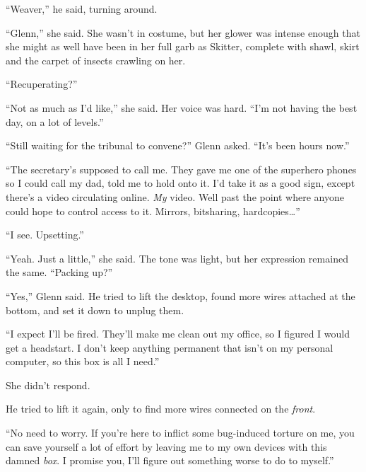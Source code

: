 ``Weaver,'' he said, turning around.



``Glenn,'' she said.  She wasn't in costume, but her glower was intense enough that she might as well have been in her full garb as Skitter, complete with shawl, skirt and the carpet of insects crawling on her.



``Recuperating?''



``Not as much as I'd like,'' she said.  Her voice was hard.  ``I'm not having the best day, on a lot of levels.''



``Still waiting for the tribunal to convene?''  Glenn asked.  ``It's been hours now.''



``The secretary's supposed to call me.  They gave me one of the superhero phones so I could call my dad, told me to hold onto it.  I'd take it as a good sign, except there's a video circulating online.  \emph{My} video.  Well past the point where anyone could hope to control access to it.  Mirrors, bitsharing, hardcopies\ldots''



``I see.  Upsetting.''



``Yeah.  Just a little,'' she said.  The tone was light, but her expression remained the same.  ``Packing up?''



``Yes,'' Glenn said.  He tried to lift the desktop, found more wires attached at the bottom, and set it down to unplug them.



``I expect I'll be fired.  They'll make me clean out my office, so I figured I would get a headstart.  I don't keep anything permanent that isn't on my personal computer, so this box is all I need.''



She didn't respond.



He tried to lift it again, only to find more wires connected on the \emph{front}.



``No need to worry.  If you're here to inflict some bug-induced torture on me, you can save yourself a lot of effort by leaving me to my own devices with this damned \emph{box}.  I promise you, I'll figure out something worse to do to myself.''



